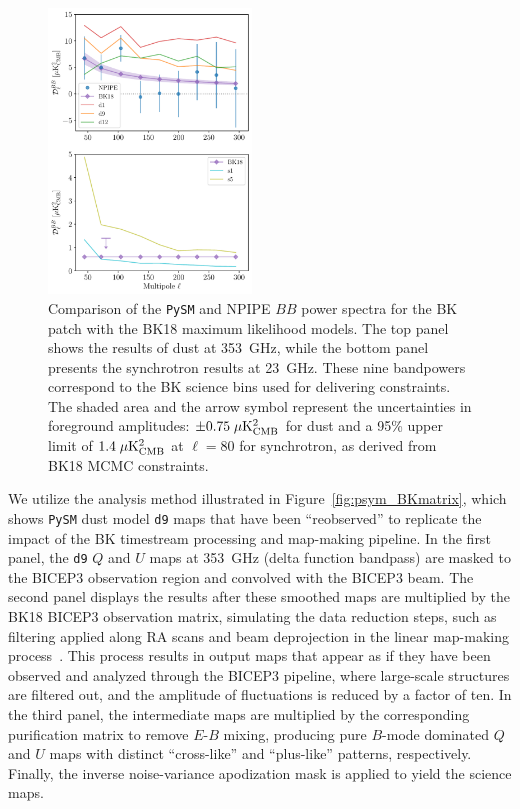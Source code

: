 \documentclass[twocolumn]{aastex631}
\begin{document}
\begin{figure}
    \centering
    \includegraphics[width=0.48\textwidth]{figures/BKfield_power.pdf}
    \caption{Comparison of the \texttt{PySM} and NPIPE $BB$ power spectra for the BK patch with the BK18 maximum likelihood models. The top panel shows the results of dust at 353~GHz, while the bottom panel presents the synchrotron results at 23~GHz. These nine bandpowers correspond to the BK science bins used for delivering constraints. The shaded area and the arrow symbol represent the uncertainties in foreground amplitudes: $\pm 0.75 \; \mu\rm{K^2_{CMB}}$ for dust and a 95\% upper limit of $1.4 \; \mu\rm{K^2_{CMB}}$ at $\ell = 80$ for synchrotron, as derived from BK18 MCMC constraints.}
    \label{fig:BKfield_power}
\end{figure}

We utilize the analysis method illustrated in Figure~\ref{fig:psym_BKmatrix}, which shows \texttt{PySM} dust model \texttt{d9} maps that have been ``reobserved'' to replicate the impact of the BK timestream processing and map-making pipeline. In the first panel, the \texttt{d9} $Q$ and $U$ maps at 353~GHz (delta function bandpass) are masked to the BICEP3 observation region and convolved with the BICEP3 beam. The second panel displays the results after these smoothed maps are multiplied by the BK18 BICEP3 observation matrix, simulating the data reduction steps, such as filtering applied along RA scans and beam deprojection in the linear map-making process~\citep{BICEP2Collaboration:2016}. This process results in output maps that appear as if they have been observed and analyzed through the BICEP3 pipeline, where large-scale structures are filtered out, and the amplitude of fluctuations is reduced by a factor of ten. In the third panel, the intermediate maps are multiplied by the corresponding purification matrix to remove $E$-$B$ mixing, producing pure $B$-mode dominated $Q$ and $U$ maps with distinct ``cross-like'' and ``plus-like'' patterns,  respectively. Finally, the inverse noise-variance apodization mask is applied to yield the science maps. 
\end{document}
